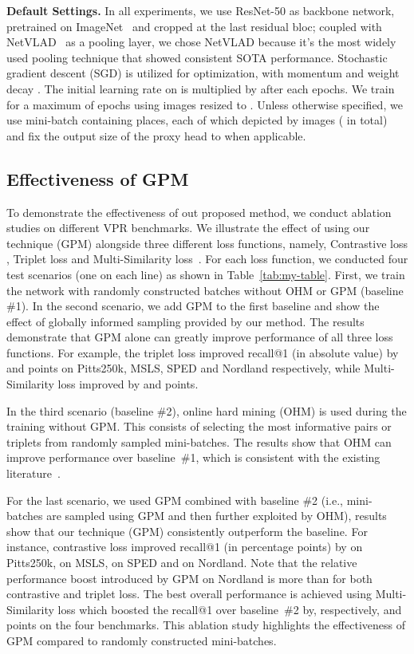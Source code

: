 \documentclass{bmvc2k}
\begin{document}
\noindent\textbf{Default Settings.}
In all experiments, we use ResNet-50\cite{he2016deep} as backbone network, pretrained on ImageNet~\cite{krizhevsky2012imagenet} and cropped at the last residual bloc; coupled with NetVLAD~\cite{arandjelovic2016netvlad} as a pooling layer, we chose NetVLAD because it's the most widely used pooling technique that showed consistent SOTA performance. Stochastic gradient descent (SGD) is utilized for optimization, with momentum  and weight decay . The initial learning rate on  is multiplied by  after each  epochs. We train for a maximum of  epochs using images resized to .
Unless otherwise specified, we use mini-batch containing  places, each of which depicted by  images ( in total) and fix the output size of the proxy head  to  when applicable.

\subsection{Effectiveness of GPM}
To demonstrate the effectiveness of out proposed method, we conduct ablation studies on  different VPR benchmarks. We illustrate the effect of using our technique (GPM) alongside three different loss functions, namely, Contrastive loss \cite{hadsell2006dimensionality}, Triplet loss \cite{hermans2017defense} and Multi-Similarity loss~\cite{wang2019multi}. For each loss function, we conducted four  test scenarios (one on each line) as shown in Table~\ref{tab:my-table}. First, we train the network with randomly constructed batches without OHM or GPM (baseline \#1). In the second scenario, we add GPM to the first baseline and show the effect of globally informed sampling provided by our method. The results demonstrate that GPM alone can greatly improve performance of all three loss functions. For example, the triplet loss improved recall@1 (in absolute value) by  and  points on Pitts250k, MSLS, SPED and Nordland respectively, while Multi-Similarity loss improved by  and  points.  

In the third scenario (baseline \#2), online hard mining (OHM) is used during the training without GPM. This consists of selecting the most informative pairs or triplets from randomly sampled mini-batches. The results show that OHM can improve performance over baseline~\#1, which is consistent with the existing literature~\cite{hermans2017defense}. 

For the last scenario, we used GPM combined with baseline \#2 (i.e., mini-batches are sampled using GPM and then further exploited by OHM), results show that our technique (GPM) consistently outperform the baseline. For instance, contrastive loss improved recall@1 (in percentage points) by  on Pitts250k,  on MSLS,  on SPED and  on Nordland. Note that the relative performance boost introduced by GPM on Nordland is more than  for both contrastive and triplet loss. The best overall performance is achieved using Multi-Similarity loss which boosted the recall@1 over baseline~\#2 by, respectively,  and  points on the four benchmarks. This ablation study highlights the effectiveness of GPM compared to randomly constructed mini-batches.
\end{document}
